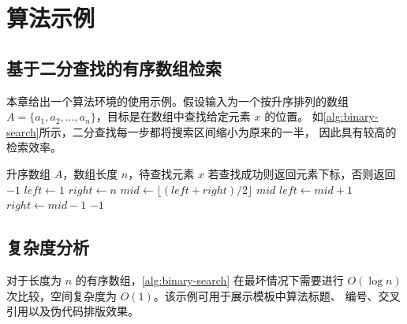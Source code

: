 
\chapter{算法示例}

\section{基于二分查找的有序数组检索}

本章给出一个算法环境的使用示例。假设输入为一个按升序排列的数组
$A = \{a_1, a_2, \ldots, a_n\}$，目标是在数组中查找给定元素 $x$ 的位置。
如\autoref{alg:binary-search}所示，二分查找每一步都将搜索区间缩小为原来的一半，
因此具有较高的检索效率。

\begin{algorithm}[htbp]
    \caption{二分查找算法示例}
    \label{alg:binary-search}
    \begin{algorithmic}[1]
        \Require 升序数组 $A$，数组长度 $n$，待查找元素 $x$
        \Ensure 若查找成功则返回元素下标，否则返回 $-1$
        \State $left \gets 1$
        \State $right \gets n$
            \State $mid \gets \lfloor (left + right) / 2 \rfloor$
                \State \Return $mid$
                \State $left \gets mid + 1$
            \Else
                \State $right \gets mid - 1$
            \EndIf
        \EndWhile
        \State \Return $-1$
    \end{algorithmic}
\end{algorithm}

\section{复杂度分析}

对于长度为 $n$ 的有序数组，\autoref{alg:binary-search} 在最坏情况下需要进行
$O(\log n)$ 次比较，空间复杂度为 $O(1)$。该示例可用于展示模板中算法标题、
编号、交叉引用以及伪代码排版效果。
